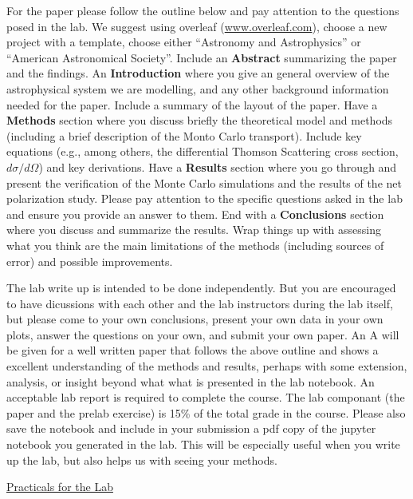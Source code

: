 \documentclass[12pt]{amsart}
\begin{document}
For the paper please follow the outline below and pay attention to the
questions posed in the lab.  We suggest using overleaf
(\url{www.overleaf.com}), choose a new project with a template, choose
either ``Astronomy and Astrophysics'' or ``American Astronomical
Society''. Include an {\bf{Abstract}} summarizing the paper and the
findings.  An {\bf{Introduction}} where you give an general overview
of the astrophysical system we are modelling, and any other background
information needed for the paper. Include a summary of the layout of
the paper. Have a {\bf{Methods}} section where you discuss briefly the
theoretical model and methods (including a brief description of the
Monto Carlo transport).  Include key equations (e.g., among others,
the differential Thomson Scattering cross section, $d\sigma/d\Omega$)
and key derivations. Have a {\bf{Results}} section where you go through and
present the verification of the Monte Carlo simulations and the
results of the net polarization study. Please pay attention to the
specific questions asked in the lab and ensure you provide an answer
to them. End with a {\bf{Conclusions}} section where you discuss and
summarize the results. Wrap things up with assessing what you think
are the main limitations of the methods (including sources of error)
and possible improvements.
\newline

The lab write up is intended to be done independently. But you are
encouraged to have dicussions with each other and the lab instructors
during the lab itself, but please come to your own conclusions,
present your own data in your own plots, answer the questions on your
own, and submit your own paper. An A will be given for a well written
paper that follows the above outline and shows a excellent
understanding of the methods and results, perhaps with some extension,
analysis, or insight beyond what what is presented in the lab
notebook. An acceptable lab report is required to complete the course.
The lab componant (the paper and the prelab exercise) is 15\% of the
total grade in the course. Please also save the notebook and include
in your submission a pdf copy of the jupyter notebook you generated in
the lab.  This will be especially useful when you write up the lab,
but also helps us with seeing your methods.

\centerline{\Large \underline{Practicals for the Lab} }
\vspace*{0.5cm}
\end{document}
